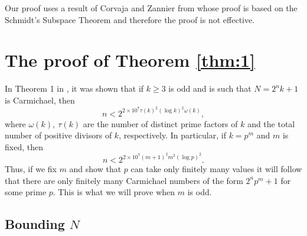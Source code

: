 \documentclass[11pt]{article}
\begin{document}
Our proof uses a result of Corvaja and Zannier from \cite{CZ} whose proof is based on the Schmidt's Subspace Theorem and therefore the proof is not effective. 
 
\section{The proof of Theorem \ref{thm:1}}

In Theorem 1 in \cite{CLP}, it was shown that if $k\ge 3$ is odd and is such that $N=2^nk+1$ is Carmichael, then 
$$
n<2^{2\times 10^7 \tau(k)^2 (\log k)^2 \omega(k)},
$$
where $\omega(k),~\tau(k)$ are the number of distinct prime factors of $k$ and the total number of positive divisors of $k$, respectively. In particular, if $k=p^m$ and $m$ is fixed, then 
$$
n<2^{2\times 10^7 (m+1)^2 m^2(\log p)^2}.
$$
Thus, if we fix $m$ and show that $p$ can take only finitely many values it will follow that there are only finitely many Carmichael numbers of the form $2^np^m+1$ for some prime $p$. This is what we will prove when $m$ is odd.

\subsection{Bounding $N$}
\end{document}
